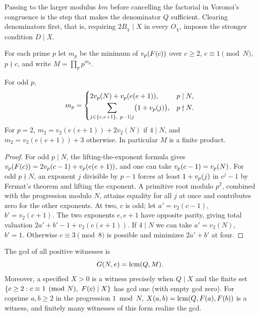 Passing to the larger modulus $km$ before cancelling the factorial in
Voronoi's congruence is the step that makes the denominator $Q$ sufficient.
Clearing denominators first, that is, requiring $2B_\chi\mid X$ in every
$O_\chi$, imposes the stronger condition $D\mid X$.

For each prime $p$ let $m_p$ be the minimum of $v_p(F(c))$ over $c\ge2$,
$c\equiv1\pmod N$, $p\nmid c$, and write $M=\prod_pp^{m_p}$.

\begin{lemma}\label{spn:lem:mp}
For odd $p$,
\begin{equation}\label{spn:eq:mp}
 m_p=\begin{cases}
 2v_p(N)+v_p(e(e+1)),&p\mid N,\\[2pt]
 \displaystyle\sum_{j\in\{e,e+1\},\ p-1\mid j}\bigl(1+v_p(j)\bigr),&p\nmid N .
 \end{cases}
\end{equation}
For $p=2$, $m_2=v_2(e(e+1))+2v_2(N)$ if $4\mid N$, and
$m_2=v_2(e(e+1))+3$ otherwise. In particular $M$ is a finite product.
\end{lemma}

\begin{proof}
For odd $p\mid N$, the lifting-the-exponent formula gives
$v_p(F(c))=2v_p(c-1)+v_p(e(e+1))$, and one can take $v_p(c-1)=v_p(N)$. For
odd $p\nmid N$, an exponent $j$ divisible by $p-1$ forces at least
$1+v_p(j)$ in $c^j-1$ by Fermat's theorem and lifting the exponent. A
primitive root modulo $p^2$, combined with the progression modulo $N$,
attains equality for all $j$ at once and contributes zero for the other
exponents. At two, $c$ is odd; let $a'=v_2(c-1)$, $b'=v_2(c+1)$. The two
exponents $e,e+1$ have opposite parity, giving total valuation
$2a'+b'-1+v_2(e(e+1))$. If $4\mid N$ we can take $a'=v_2(N)$, $b'=1$.
Otherwise $c\equiv3\pmod8$ is possible and minimizes $2a'+b'$ at four.
\end{proof}

\begin{theorem}\label{spn:thm:gcd}
The gcd of all positive witnesses is
\begin{equation}\label{spn:eq:G}
 G(N,e)=\operatorname{lcm}(Q,M).
\end{equation}
Moreover, a specified $X>0$ is a witness precisely when $Q\mid X$ and the
finite set $\{c\ge2:c\equiv1\pmod N,\ F(c)\mid X\}$ has gcd one (with empty
gcd zero). For coprime $a,b\ge2$ in the progression $1\bmod N$,
$X(a,b)=\operatorname{lcm}(Q,F(a),F(b))$ is a witness, and finitely many witnesses of this
form realize the gcd.
\end{theorem}

